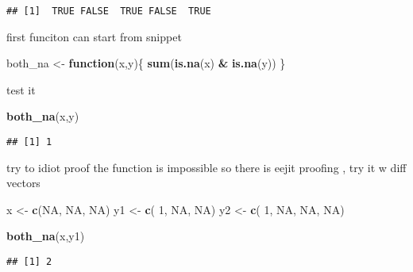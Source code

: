 \documentclass[]{article}
\newenvironment{Shaded}{\begin{snugshade}}{\end{snugshade}}
\newcommand{\KeywordTok}[1]{\textcolor[rgb]{0.13,0.29,0.53}{\textbf{#1}}}
\newcommand{\DecValTok}[1]{\textcolor[rgb]{0.00,0.00,0.81}{#1}}
\newcommand{\StringTok}[1]{\textcolor[rgb]{0.31,0.60,0.02}{#1}}
\newcommand{\OtherTok}[1]{\textcolor[rgb]{0.56,0.35,0.01}{#1}}
\newcommand{\ControlFlowTok}[1]{\textcolor[rgb]{0.13,0.29,0.53}{\textbf{#1}}}
\newcommand{\OperatorTok}[1]{\textcolor[rgb]{0.81,0.36,0.00}{\textbf{#1}}}
\newcommand{\NormalTok}[1]{#1}
\begin{document}
\begin{verbatim}
## [1]  TRUE FALSE  TRUE FALSE  TRUE
\end{verbatim}

first funciton can start from snippet

\begin{Shaded}
\begin{Highlighting}[]
\NormalTok{both_na <-}\StringTok{  }\ControlFlowTok{function}\NormalTok{(x,y)\{}
  \KeywordTok{sum}\NormalTok{(}\KeywordTok{is.na}\NormalTok{(x) }\OperatorTok{&}\StringTok{ }\KeywordTok{is.na}\NormalTok{(y))}
\NormalTok{\}}
\end{Highlighting}
\end{Shaded}

test it

\begin{Shaded}
\begin{Highlighting}[]
\KeywordTok{both_na}\NormalTok{(x,y)}
\end{Highlighting}
\end{Shaded}

\begin{verbatim}
## [1] 1
\end{verbatim}

try to idiot proof the function is impossible so there is eejit proofing
, try it w diff vectors

\begin{Shaded}
\begin{Highlighting}[]
\NormalTok{x <-}\StringTok{ }\KeywordTok{c}\NormalTok{(}\OtherTok{NA}\NormalTok{, }\OtherTok{NA}\NormalTok{, }\OtherTok{NA}\NormalTok{)}
\NormalTok{y1 <-}\StringTok{ }\KeywordTok{c}\NormalTok{( }\DecValTok{1}\NormalTok{, }\OtherTok{NA}\NormalTok{, }\OtherTok{NA}\NormalTok{)}
\NormalTok{y2 <-}\StringTok{ }\KeywordTok{c}\NormalTok{( }\DecValTok{1}\NormalTok{, }\OtherTok{NA}\NormalTok{, }\OtherTok{NA}\NormalTok{, }\OtherTok{NA}\NormalTok{)}
\end{Highlighting}
\end{Shaded}

\begin{Shaded}
\begin{Highlighting}[]
\KeywordTok{both_na}\NormalTok{(x,y1)}
\end{Highlighting}
\end{Shaded}

\begin{verbatim}
## [1] 2
\end{verbatim}
\end{document}
